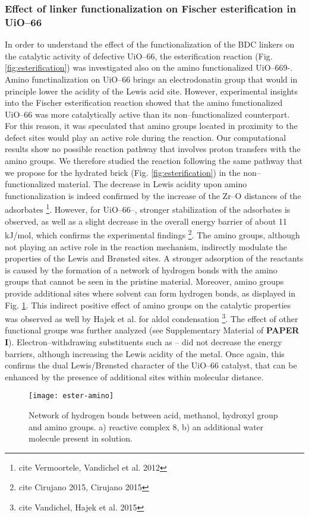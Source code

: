 \subsubsection{Effect of linker functionalization on Fischer esterification in UiO--66}
In order to understand the effect of the functionalization of the BDC linkers on the catalytic activity of defective UiO--66, the esterification reaction (Fig. \ref{fig:esterification}) was investigated also on the amino functionalized UiO--669-.  Amino functinalization on UiO--66 brings an electrodonatin group that would in principle lower the acidity of the Lewis acid site. However, experimental insights into the Fischer esterification reaction showed that the amino functionalized UiO--66 was more catalytically active than its non--functionalized counterpart. For this reason, it was speculated that amino groups located in proximity to the defect sites would play an active role during the reaction. Our computational results show no possible reaction pathway that involves proton transfers with the amino groups. We therefore studied the reaction following the same pathway that we propose for the hydrated brick (Fig. \ref{fig:esterification}) in the non--functionalized material. The decrease in Lewis acidity upon amino functionalization is indeed confirmed by the increase of the Zr--O distances of the adsorbates \footnote{cite Vermoortele, Vandichel et al. 2012}. However, for UiO--66--, stronger stabilization of the adsorbates is observed, as well as a slight decrease in the overall energy barrier of about 11 kJ/mol, which confirms the experimental findings \footnote{cite Cirujano 2015, Cirujano 2015}. The amino groups, although not playing an active role in the reaction mechanism, indirectly modulate the properties of the Lewis and Br\o{}nsted sites. A stronger adsorption of the reactants is caused by the formation of a network of hydrogen bonds with the amino groups that cannot be seen in the pristine material. Moreover, amino groups provide additional sites where solvent can form hydrogen bonds, as displayed in Fig. \ref{fig:ester-amino}. This indirect positive effect of amino groups on the catalytic properties was observed as well by Hajek et al. for aldol condensation \footnote{cite Vandichel, Hajek et al. 2015}. The effect of other functional groups was further analyzed (see Supplementary Material of \textbf{PAPER I}). Electron--withdrawing substituents such as -- did not decrease the energy barriers, although increasing the Lewis acidity of the metal. Once again, this confirms the dual Lewis/Br\o{}nsted character of the UiO--66 catalyst, that can be enhanced by the presence of additional sites within molecular distance. 
\begin{figure}[!htbp]
	\centering
	\texttt{[image: ester-amino]}
	\caption{Network of hydrogen bonds between acid, methanol, hydroxyl group and amino groups. a) reactive complex 8, b) an additional water molecule present in solution.}
	\label{fig:ester-amino}
\end{figure}

